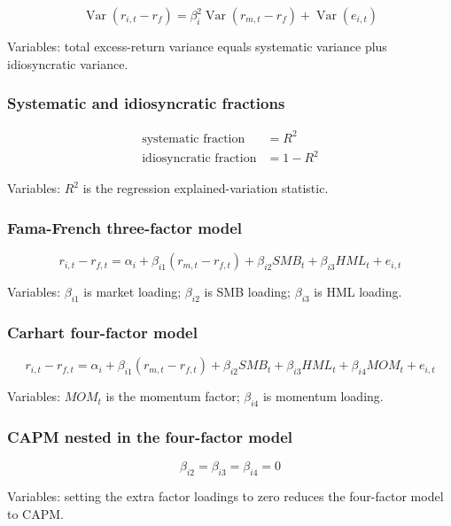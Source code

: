 \documentclass[
  8pt,
  twocolumn]{extarticle}
\begin{document}
\[
\operatorname{Var}(r_{i,t}-r_f)=\beta_i^2\operatorname{Var}(r_{m,t}-r_f)+\operatorname{Var}(e_{i,t})
\]

Variables: total excess-return variance equals systematic variance plus
idiosyncratic variance.

\subsubsection{Systematic and idiosyncratic
fractions}\label{systematic-and-idiosyncratic-fractions}

\[
\begin{aligned}
\text{systematic fraction}&=R^2\\
\text{idiosyncratic fraction}&=1-R^2
\end{aligned}
\]

Variables: \(R^2\) is the regression explained-variation statistic.

\subsubsection{Fama-French three-factor
model}\label{fama-french-three-factor-model}

\[
r_{i,t}-r_{f,t}=\alpha_i+\beta_{i1}(r_{m,t}-r_{f,t})+\beta_{i2}SMB_t+\beta_{i3}HML_t+e_{i,t}
\]

Variables: \(\beta_{i1}\) is market loading; \(\beta_{i2}\) is SMB
loading; \(\beta_{i3}\) is HML loading.

\subsubsection{Carhart four-factor
model}\label{carhart-four-factor-model}

\[
r_{i,t}-r_{f,t}=\alpha_i+\beta_{i1}(r_{m,t}-r_{f,t})+\beta_{i2}SMB_t+\beta_{i3}HML_t+\beta_{i4}MOM_t+e_{i,t}
\]

Variables: \(MOM_t\) is the momentum factor; \(\beta_{i4}\) is momentum
loading.

\subsubsection{CAPM nested in the four-factor
model}\label{capm-nested-in-the-four-factor-model}

\[
\beta_{i2}=\beta_{i3}=\beta_{i4}=0
\]

Variables: setting the extra factor loadings to zero reduces the
four-factor model to CAPM.
\end{document}
